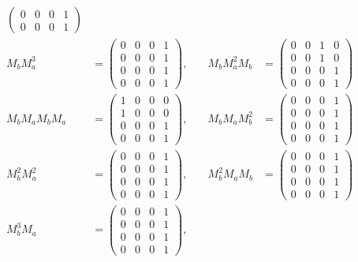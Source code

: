 \begin{ex}
\begin{sol}
\begin{enumerate}
\begin{align*}
\begin{pmatrix}
    0 & 0 & 0 & 1 \\
    0 & 0 & 0 & 1
\end{pmatrix} \\[10pt]
M_b M_a^3 &=
\begin{pmatrix}
    0 & 0 & 0 & 1 \\
    0 & 0 & 0 & 1 \\
    0 & 0 & 0 & 1 \\
    0 & 0 & 0 & 1
\end{pmatrix}, \quad
&M_b M_a^2 M_b &=
\begin{pmatrix}
    0 & 0 & 1 & 0 \\
    0 & 0 & 1 & 0 \\
    0 & 0 & 0 & 1 \\
    0 & 0 & 0 & 1
\end{pmatrix} \\[10pt]
M_b M_a M_b M_a &=
\begin{pmatrix}
    1 & 0 & 0 & 0 \\
    1 & 0 & 0 & 0 \\
    0 & 0 & 0 & 1 \\
    0 & 0 & 0 & 1
\end{pmatrix}, \quad
&M_b M_a M_b^2 &=
\begin{pmatrix}
    0 & 0 & 0 & 1 \\
    0 & 0 & 0 & 1 \\
    0 & 0 & 0 & 1 \\
    0 & 0 & 0 & 1
\end{pmatrix} \\[10pt]
M_b^2 M_a^2 &=
\begin{pmatrix}
    0 & 0 & 0 & 1 \\
    0 & 0 & 0 & 1 \\
    0 & 0 & 0 & 1 \\
    0 & 0 & 0 & 1
\end{pmatrix}, \quad
&M_b^2 M_a M_b &=
\begin{pmatrix}
    0 & 0 & 0 & 1 \\
    0 & 0 & 0 & 1 \\
    0 & 0 & 0 & 1 \\
    0 & 0 & 0 & 1
\end{pmatrix} \\[10pt]
M_b^3 M_a &=
\begin{pmatrix}
    0 & 0 & 0 & 1 \\
    0 & 0 & 0 & 1 \\
    0 & 0 & 0 & 1 \\
    0 & 0 & 0 & 1
\end{pmatrix}, \quad

\end{align*}
\end{enumerate}
\end{sol}
\end{ex}
